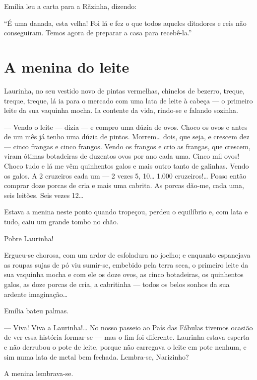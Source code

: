 Emília leu a carta para a Rãzinha, dizendo:

``É uma danada, esta velha! Foi lá e fez o que todos aqueles ditadores e
reis não conseguiram. Temos agora de preparar a casa para recebê-la.''


\chapter{A menina do leite}

Laurinha, no seu vestido novo de pintas vermelhas, chinelos de bezerro,
treque, treque, treque, lá ia para o mercado com uma lata de leite à
cabeça --- o primeiro leite da sua vaquinha mocha. Ia contente da vida,
rindo-se e falando sozinha.

--- Vendo o leite --- dizia --- e compro uma dúzia de ovos. Choco os
ovos e antes de um mês já tenho uma dúzia de pintos. Morrem\ldots{}
dois, que seja, e crescem dez --- cinco frangas e cinco frangos. Vendo
os frangos e crio as frangas, que crescem, viram ótimas botadeiras de
duzentos ovos por ano cada uma. Cinco mil ovos! Choco tudo e lá me vêm
quinhentos galos e mais outro tanto de galinhas. Vendo os galos. A 2
cruzeiros cada um --- 2 vezes 5, 10\ldots{} 1.000 cruzeiros!\ldots{}
Posso então comprar doze porcas de cria e mais uma cabrita. As porcas
dão-me, cada uma, seis leitões. Seis vezes 12\ldots{}

Estava a menina neste ponto quando tropeçou, perdeu o equilíbrio e, com
lata e tudo, caiu um grande tombo no chão.

Pobre Laurinha!

Ergueu-se chorosa, com um ardor de esfoladura no joelho; e enquanto
espanejava as roupas sujas de pó viu sumir-se, embebido pela terra seca,
o primeiro leite da sua vaquinha mocha e com ele os doze ovos, as cinco
botadeiras, os quinhentos galos, as doze porcas de cria, a cabritinha
--- todos os belos sonhos da sua ardente imaginação\ldots{}

Emília bateu palmas.

--- Viva! Viva a Laurinha!\ldots{} No nosso passeio ao País das Fábulas
tivemos ocasião de ver essa história formar-se --- mas o fim foi
diferente. Laurinha estava esperta e não derrubou o pote de leite,
porque não carregava o leite em pote nenhum, e sim numa lata de metal
bem fechada. Lembra-se, Narizinho?

A menina lembrava-se.

